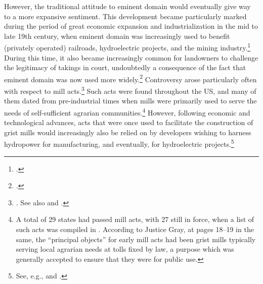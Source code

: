 However, the traditional attitude to eminent domain would eventually give way to a more expansive sentiment. This development became particularly marked during the period of great economic expansion and industrialization in the mid to late 19th century, when eminent domain was increasingly used to benefit (privately operated) railroads, hydroelectric projects, and the mining industry.\footcite[23-33]{meidinger80} During this time, it also became increasingly common for landowners to challenge the legitimacy of takings in court, undoubtedly a consequence of the fact that eminent domain was now used more widely.\footcite[24]{meidinger80} Controversy arose particularly often with respect to mill acts.\footnote{\cite[24]{meidinger80}. See also \cite[306-313]{johnson11} and \cite[251-252]{horwitz73}.} Such acts were found throughout the US, and many of them dated from pre-industrial times when mills were primarily used to serve the needs of self-sufficient agrarian communities.\footnote{A total of 29 states had passed mill acts, with 27 still in force, when a list of such acts was compiled in \cite[17]{head85}. According to Justice Gray, at pages 18--19 in the same, the ``principal objects'' for early mill acts had been grist mills typically serving local agrarian needs at tolls fixed by law, a purpose which was generally accepted to ensure that they were for public use.}  However, following economic and technological advances, acts that were once used to facilitate the construction of grist mills would increasingly also be relied on by developers wishing to harness hydropower for manufacturing, and eventually, for hydroelectric projects.\footnote{See, e.g., \cite[18-21]{head85} and \cite[449-452]{minn06}.}

